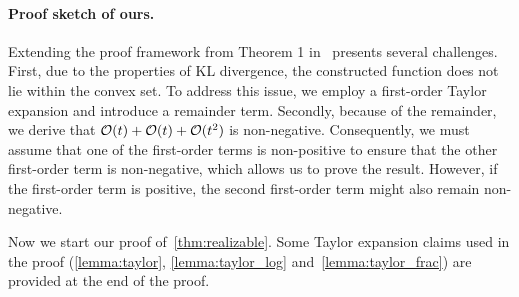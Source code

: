\paragraph{Proof sketch of ours.}
Extending the proof framework from Theorem 1 in~\citep{charikar2024quantifying} presents several challenges. 
First, due to the properties of KL divergence, the constructed function does not lie within the convex set. To address this issue, we employ a first-order Taylor expansion and introduce a remainder term.
Secondly, because of the remainder, we derive that $\mathcal{O}(t)+\mathcal{O}(t)+\mathcal{O}(t^2)$ is non-negative. Consequently, we must assume that one of the first-order terms is non-positive to ensure that the other first-order term is non-negative, which allows us to prove the result.
However, if the first-order term is positive, the second first-order term might also remain non-negative.




Now we start our proof of~\cref{thm:realizable}.
Some Taylor expansion claims used in the proof (\cref{lemma:taylor}, \cref{lemma:taylor_log} and~\cref{lemma:taylor_frac}) are provided at the end of the proof.


